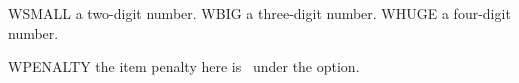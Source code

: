 
\makeatletter

\setcounter{ExNo}{5}
\ea WSMALL a two-digit number.
\z
\setcounter{ExNo}{100}
\ea WBIG a three-digit number.
\z
\setcounter{ExNo}{1000}
\ea WHUGE a four-digit number.
\z

\ea WPENALTY the item penalty here is \the\@itempenalty\ under the option.
\z

